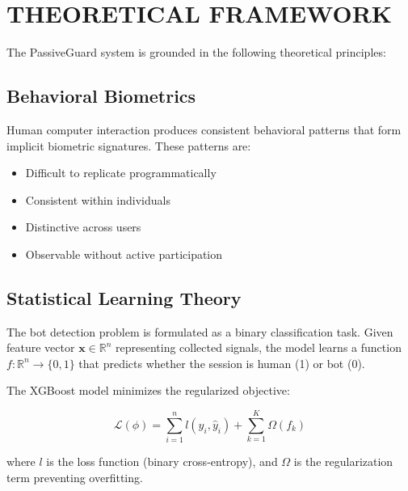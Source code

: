 \section{THEORETICAL FRAMEWORK}

The PassiveGuard system is grounded in the following theoretical principles:

\subsection{Behavioral Biometrics}

Human computer interaction produces consistent behavioral patterns that form implicit biometric signatures. These patterns are:
\begin{itemize}
    \item Difficult to replicate programmatically
    \item Consistent within individuals
    \item Distinctive across users
    \item Observable without active participation
\end{itemize}

\subsection{Statistical Learning Theory}

The bot detection problem is formulated as a binary classification task. Given feature vector $\mathbf{x} \in \mathbb{R}^n$ representing collected signals, the model learns a function $f: \mathbb{R}^n \rightarrow \{0, 1\}$ that predicts whether the session is human (1) or bot (0).

The XGBoost model minimizes the regularized objective:

$$\mathcal{L}(\phi) = \sum_{i=1}^{n} l(y_i, \hat{y}_i) + \sum_{k=1}^{K} \Omega(f_k)$$

where $l$ is the loss function (binary cross-entropy), and $\Omega$ is the regularization term preventing overfitting.

